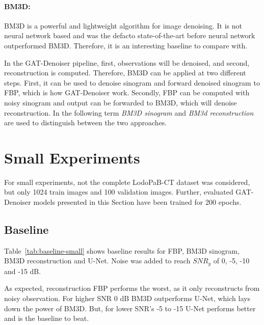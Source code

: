 \paragraph{BM3D:}
BM3D is a powerful and lightweight algorithm for image denoising. 
It is not neural network based and was the defacto state-of-the-art before neural network outperformed
BM3D. Therefore, it is an interesting baseline to compare with.

In the GAT-Denoiser pipeline, first, observations will be denoised, and second, reconstruction is computed.
Therefore, BM3D can be applied at two different steps. First, it can be used to denoise sinogram
and forward denoised sinogram to FBP, which is how GAT-Denoiser work. Secondly, FBP can be
computed with noisy sinogram and output can be forwarded to BM3D, which will denoise reconstruction.
In the following term \textit{BM3D sinogram} and \textit{BM3d reconstruction} 
are used to distinguish between the two approaches.

\section{Small Experiments}
For small experiments, not the complete LodoPaB-CT dataset was considered, but only 1024 train images
and 100 validation images. 
Further, evaluated GAT-Denoiser models presented in this Section have been trained for 200 epochs.

\subsection{Baseline}

Table~\ref{tab:baseline-small} shows baseline results for FBP, BM3D sinogram, BM3D reconstruction and U-Net.
Noise was added to reach $\textit{SNR}_y$ of 0, -5, -10 and -15 dB.

As expected, reconstruction FBP performs the worst, as it only reconstructs from noisy observation. 
For higher SNR 0 dB BM3D outperforms U-Net, which lays down the power of BM3D.
But, for lower SNR's -5 to -15 U-Net performs better and is the baseline to beat.

